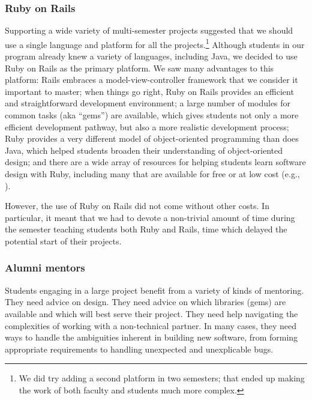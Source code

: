 \subsubsection{Ruby on Rails}

Supporting a wide variety of multi-semester projects suggested that
we should use a single language and platform for all the
projects.\footnote{We did try adding a second platform in two
semesters; that ended up making the work of both faculty and students
much more complex.}  Although students in our program already knew
a variety of languages, including Java, we decided to use Ruby on
Rails as the primary platform.  We saw many advantages to this
platform: Rails embraces a model-view-controller framework that we
consider it important to master; when things go right, Ruby on Rails
provides an efficient and straightforward development environment;
a large number of modules for common tasks (aka ``gems'') are
available, which gives students not only a more efficient development
pathway, but also a more realistic development process; Ruby
provides a very different model of object-oriented programming than
does Java, which helped students broaden their understanding of
object-oriented design; and there are a wide array of resources for
helping students learn software design with Ruby, including many
that are available for free or at low cost (e.g.,
\cite{saasbook,railstutorial}).

However, the use of Ruby on Rails did not come without other costs.  In
particular, it meant that we had to devote a non-trivial amount of
time during the semester teaching students both Ruby and Rails, time
which delayed the potential start of their projects.

\subsubsection{Alumni mentors}

Students engaging in a large project benefit from a variety of kinds
of mentoring.  They need advice on design.  They need advice on
which libraries (gems) are available and which will best serve their
project.  They need help navigating the complexities of working
with a non-technical partner.  In many cases, they need ways to
handle the ambiguities inherent in building new software, from
forming appropriate requirements to handling unexpected and
unexplicable bugs.

